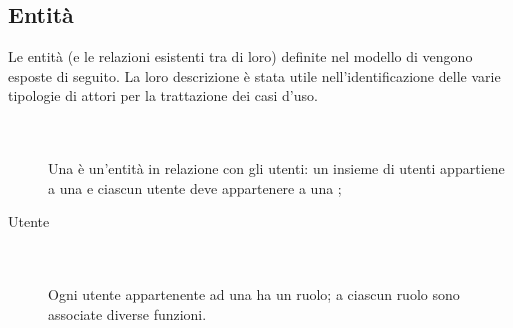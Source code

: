 \subsection{Entit\`a}
Le entit\`a (e le relazioni esistenti tra di loro) definite nel modello  di  vengono esposte di seguito. La loro descrizione \`e stata utile nell'identificazione delle varie tipologie di attori per la trattazione dei casi d'uso.
\begin{description}
	\item[] \hfill \\\\
	Una  \`e un'entit\`a in relazione con gli utenti: un insieme di utenti appartiene a una  e ciascun utente deve appartenere a una ;
	\item[Utente] \hfill \\\\
	Ogni utente appartenente ad una  ha un ruolo; a ciascun ruolo sono associate diverse funzioni.	
	

\end{description}
